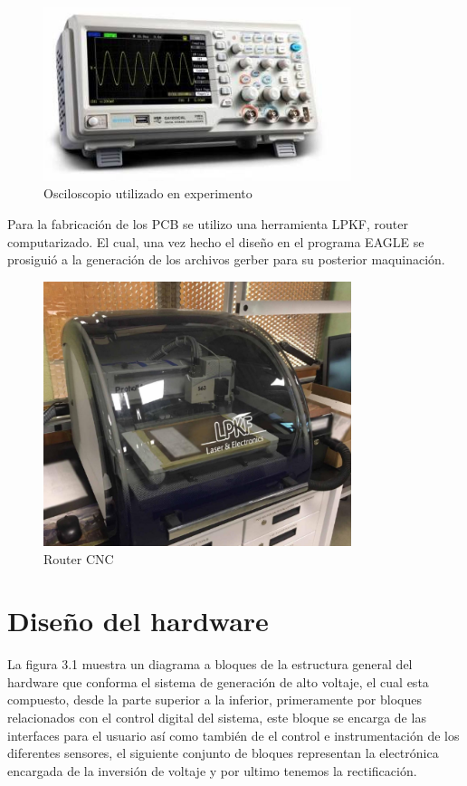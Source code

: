 \begin{figure}[H]
\centering
\includegraphics[width=9cm]{Capitulo3/figs/oscilo.png}
\caption{Osciloscopio utilizado en experimento}
\end{figure}

Para la fabricación de los PCB se utilizo una herramienta LPKF, router computarizado. El cual, una vez hecho el diseño en el programa EAGLE se prosiguió a la generación de los archivos gerber para su posterior maquinación. 

\begin{figure}[H]
\centering
\includegraphics[width=9cm]{Capitulo3/figs/proto.png}
\caption{Router CNC}
\end{figure}
\newpage


\section{Diseño del hardware}


La figura 3.1 muestra un diagrama a bloques de la estructura general del hardware que conforma el sistema de generación de alto voltaje, el cual esta compuesto, desde la parte superior a la inferior, primeramente por bloques relacionados con el control digital del sistema, este bloque se encarga de las interfaces para el usuario así como también de el control e instrumentación de los diferentes sensores, el siguiente conjunto de bloques representan la electrónica encargada de la inversión de voltaje y por ultimo tenemos la rectificación.  \\

